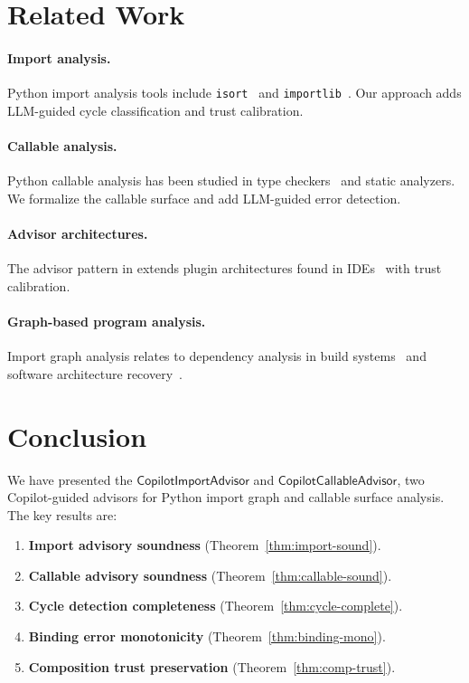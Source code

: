 \documentclass[11pt]{article}
\newcommand{\ImportAdv}{\mathsf{CopilotImportAdvisor}}
\newcommand{\CallAdv}{\mathsf{CopilotCallableAdvisor}}
\begin{document}
\section{Related Work}
\label{sec:related}

\paragraph{Import analysis.}
Python import analysis tools include \texttt{isort}~\cite{isort2020}
and \texttt{importlib}~\cite{python2024importlib}.  Our approach
adds LLM-guided cycle classification and trust calibration.

\paragraph{Callable analysis.}
Python callable analysis has been studied in type
checkers~\cite{mypy2024} and static analyzers.  We formalize
the callable surface and add LLM-guided error detection.

\paragraph{Advisor architectures.}
The advisor pattern in \JuGeo{} extends plugin architectures
found in IDEs~\cite{leino2010dafny} with trust calibration.

\paragraph{Graph-based program analysis.}
Import graph analysis relates to dependency analysis in build
systems~\cite{mokhov2018build} and software architecture
recovery~\cite{murphy2001software}.

\section{Conclusion}
\label{sec:conclusion}

We have presented the $\ImportAdv$ and $\CallAdv$, two
Copilot-guided advisors for Python import graph and callable
surface analysis.  The key results are:

\begin{enumerate}
\item \textbf{Import advisory soundness} (Theorem~\ref{thm:import-sound}).
\item \textbf{Callable advisory soundness} (Theorem~\ref{thm:callable-sound}).
\item \textbf{Cycle detection completeness} (Theorem~\ref{thm:cycle-complete}).
\item \textbf{Binding error monotonicity} (Theorem~\ref{thm:binding-mono}).
\item \textbf{Composition trust preservation} (Theorem~\ref{thm:comp-trust}).
\end{enumerate}
\end{document}
